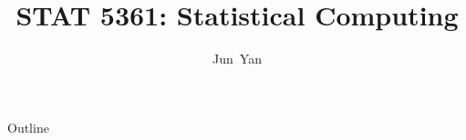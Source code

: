 \documentclass[11pt]{beamer}
\title[STAT 5361]{STAT 5361: Statistical Computing}	%
\author[Jun Yan]{Jun~Yan}
\institute[University of Connecticut]{
  Department of Statistics\\ University of Connecticut
}
\date{} %
\begin{document}
\begin{frame}
\thispagestyle{empty}
  \titlepage
\end{frame}

\begin{frame}[t,allowframebreaks]{Outline}

\begin{small}
\thispagestyle{empty}
  \tableofcontents
\end{small}
\end{frame}











% 

% 

% 

% 

% 

% 

% 

% 


% 
\end{document}

